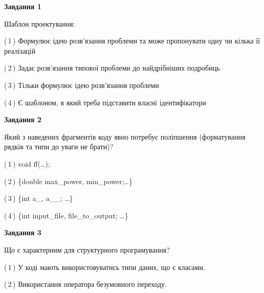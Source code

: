 \documentclass[10pt, ukrainian]{article}
\begin{document}
{
\begin {large}
{\begin {center}\textbf{Завдання 1}\end {center}}\par
Шаблон проектування:\par
\vspace{2mm}



(\,1\,) Формулює ідею розв'язання проблеми та може пропонувати одну чи кілька її реалізацій%



(\,2\,) Задає розв'язання типової проблеми до найдрібніших подробиць%



(\,3\,) Тільки формулює ідею розв'язання проблеми%



(\,4\,) Є шаблоном, в який треба підставити власні ідентифікатори%


{\begin {center}\textbf{Завдання 2}\end {center}}\par
Який з наведених фрагментів коду явно потребує поліпшення (форматування рядків та типи до уваги не брати)?\par
\vspace{2mm}



(\,1\,) void ff(…);%



(\,2\,) \{double max\_power, min\_power;…\} %



(\,3\,) \{int a\_, a\_\_; …\}%



(\,4\,) \{int input\_file, file\_to\_output; …\}%


{\begin {center}\textbf{Завдання 3}\end {center}}\par
Що є характерним для структурного програмування?\par
\vspace{2mm}



(\,1\,) У коді мають використовуватись типи даних, що є класами. %



(\,2\,) Використання оператора безумовного переходу. %




\end{large}}
\end{document}
